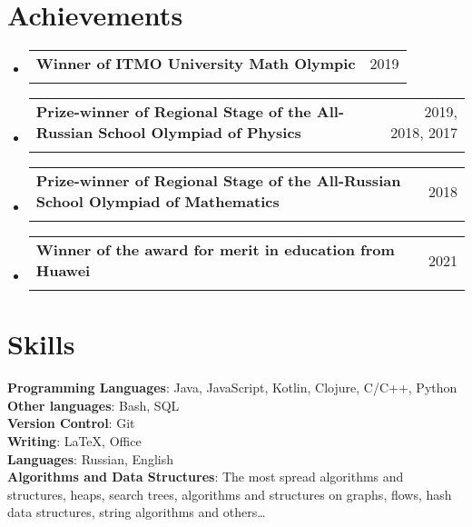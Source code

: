 \documentclass[letterpaper,10pt]{article}
\makeatletter
\newcommand{\resumeSubheading}[4]{
  \vspace{-2pt}\item
    \begin{tabular*}{0.97\textwidth}[t]{l@{\extracolsep{\fill}}r}
      \textbf{#1} & #2 \\
      \textit{\small#3} & \textit{\small #4} \\
    \end{tabular*}\vspace{-7pt}
}
\newcommand{\resumeSubHeadingListStart}{\begin{itemize}[leftmargin=0.15in, label={}]}
\newcommand{\resumeSubHeadingListEnd}{\end{itemize}}
\makeatother
\begin{document}
\section{Achievements}
\resumeSubHeadingListStart
  \resumeSubheading
    {Winner of ITMO University Math Olympic}{2019}
    {}{}
    \resumeSubheading
    {Prize-winner of Regional Stage of the All-Russian School Olympiad of Physics}{2019, 2018, 2017}
    {}{}
    \resumeSubheading
    {Prize-winner of Regional Stage of the All-Russian School Olympiad of Mathematics}{2018}
    {}{}
    \resumeSubheading
    {Winner of the award for merit in education from Huawei}{2021}
    {}{}
\resumeSubHeadingListEnd

\section{Skills}
 \begin{itemize}[leftmargin=0.15in, label={}]
    \small{\item{
     \textbf{Programming Languages}{: Java, JavaScript, Kotlin, Clojure, C/C++, Python} \\
     \textbf{Other languages}{: Bash, SQL}\\
     \textbf{Version Control}{: Git} \\
     \textbf{Writing}{: \LaTeX, Office} \\
     \textbf{Languages}{: Russian, English} \\
     \textbf{Algorithms and Data Structures}{: The most spread algorithms and structures, heaps, search trees, algorithms and structures on graphs, flows, hash data structures, string algorithms and others\dots} \\
    }}
 \end{itemize}
\end{document}
